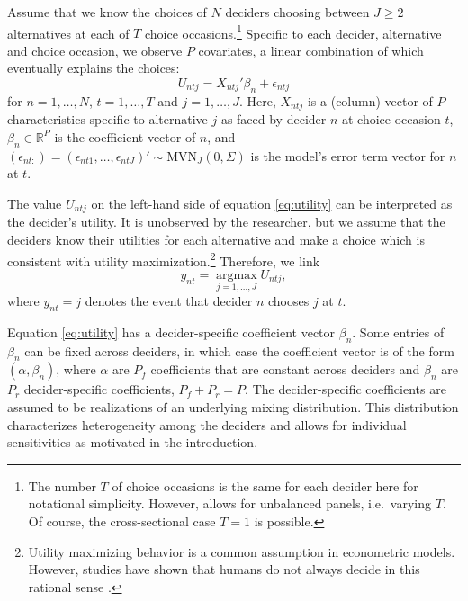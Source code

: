 \documentclass[article,shortnames]{jss}
\begin{document}
Assume that we know the choices of $N$ deciders choosing between $J \geq 2$ alternatives at each of $T$ choice occasions.\footnote{The number $T$ of choice occasions is the same for each decider here for notational simplicity. However,  allows for unbalanced panels, i.e.\ varying $T$. Of course, the cross-sectional case $T = 1$ is possible.} Specific to each decider, alternative and choice occasion, we observe $P$ covariates, a linear combination of which eventually explains the choices:
\begin{equation}
  \label{eq:utility}
  U_{ntj} = X_{ntj}'\beta_n + \epsilon_{ntj}
\end{equation}
for $n=1,\dots,N$, $t=1,\dots,T$ and $j=1,\dots,J$. Here, $X_{ntj}$ is a (column) vector of $P$ characteristics specific to alternative $j$ as faced by decider $n$ at choice occasion $t$, $\beta_n \in {\mathbb R}^{P}$ is the coefficient vector of $n$, and $(\epsilon_{nt:}) = (\epsilon_{nt1},\dots,\epsilon_{ntJ})' \sim \text{MVN}_{J} (0,\Sigma)$ is the model's error term vector for $n$ at $t$.

The value $U_{ntj}$ on the left-hand side of equation \eqref{eq:utility} can be interpreted as the decider's utility. It is unobserved by the researcher, but we assume that the deciders know their utilities for each alternative and make a choice which is consistent with utility maximization.\footnote{Utility maximizing behavior is a common assumption in econometric models. However, studies have shown that humans do not always decide in this rational sense \citep{Hewig:2011}.} Therefore, we link
\begin{equation}
   \label{eq:link}
   y_{nt} = \operatorname*{argmax}_{j = 1,\dots,J} U_{ntj},
\end{equation}
where $y_{nt}=j$ denotes the event that decider $n$ chooses $j$ at $t$.

Equation \eqref{eq:utility} has a decider-specific coefficient vector $\beta_n$. Some entries of $\beta_n$ can be fixed across deciders, in which case the coefficient vector is of the form $(\alpha, \beta_n)$, where $\alpha$ are $P_f$ coefficients that are constant across deciders and $\beta_n$ are $P_r$ decider-specific coefficients, $P_f + P_r = P$. The decider-specific coefficients are assumed to be realizations of an underlying mixing distribution. This distribution characterizes heterogeneity among the deciders and allows for individual sensitivities as motivated in the introduction.
\end{document}
